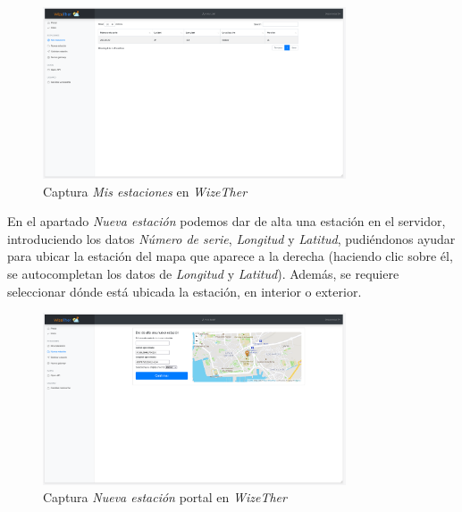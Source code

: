 \documentclass[12pt]{article}
\begin{document}
\begin{figure}[h]
	\begin{center}
		\includegraphics[width=0.8\textwidth]{img_rani/mis_estaciones.png}
		\caption{Captura \textit{Mis estaciones} en \textit{WizeTher}}
	\end{center}
\end{figure}

\pagebreak

\noindent En el apartado \textit{Nueva estación} podemos dar de alta una estación en el servidor, introduciendo los datos \textit{Número de serie}, \textit{Longitud} y \textit{Latitud}, pudiéndonos ayudar para ubicar la estación del mapa que aparece a la derecha (haciendo clic sobre él, se autocompletan los datos de \textit{Longitud} y \textit{Latitud}). Además, se requiere seleccionar dónde está ubicada la estación, en interior o exterior.

\begin{figure}[h]
	\begin{center}
		\includegraphics[width=0.8\textwidth]{img_rani/nueva_estacion.png}
		\caption{Captura \textit{Nueva estación} portal en \textit{WizeTher}}
	\end{center}
\end{figure}

\pagebreak

\noindent
\end{document}
